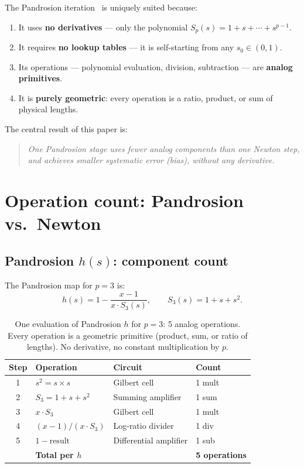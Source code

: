 \documentclass[11pt,a4paper]{article}
\theoremstyle{definition}
\begin{document}
The Pandrosion iteration~\cite{besevic2026,besevic2026b,besevic2026c,besevic2026d} is uniquely suited because:
\begin{enumerate}
  \item It uses \textbf{no derivatives} --- only the polynomial $S_p(s) = 1 + s + \cdots + s^{p-1}$.
  \item It requires \textbf{no lookup tables} --- it is self-starting from any $s_0 \in (0,1)$.
  \item Its operations --- polynomial evaluation, division, subtraction --- are \textbf{analog primitives}.
  \item It is \textbf{purely geometric}: every operation is a ratio, product, or sum of physical lengths.
\end{enumerate}

The central result of this paper is:

\begin{quote}
\emph{One Pandrosion stage uses fewer analog components than one Newton step, and achieves smaller systematic error (bias), without any derivative.}
\end{quote}

\section{Operation count: Pandrosion vs.\ Newton}
\label{sec:opcount}

\subsection{Pandrosion $h(s)$: component count}

The Pandrosion map for $p = 3$ is:
\[
  h(s) = 1 - \frac{x - 1}{x \cdot S_3(s)}, \qquad S_3(s) = 1 + s + s^2.
\]

\begin{table}[H]
\centering
\renewcommand{\arraystretch}{1.3}
\begin{tabular}{clll}
\toprule
\textbf{Step} & \textbf{Operation} & \textbf{Circuit} & \textbf{Count} \\
\midrule
1 & $s^2 = s \times s$ & Gilbert cell & 1 mult \\
2 & $S_3 = 1 + s + s^2$ & Summing amplifier & 1 sum \\
3 & $x \cdot S_3$ & Gilbert cell & 1 mult \\
4 & $(x-1) / (x \cdot S_3)$ & Log-ratio divider & 1 div \\
5 & $1 - \text{result}$ & Differential amplifier & 1 sub \\
\midrule
  & \textbf{Total per $h$} & & \textbf{5 operations} \\
\bottomrule
\end{tabular}
\caption{One evaluation of Pandrosion $h$ for $p=3$: 5 analog operations. Every operation is a geometric primitive (product, sum, or ratio of lengths).  No derivative, no constant multiplication by $p$.}
\label{tab:pandrosion_ops}
\end{table}
\end{document}

